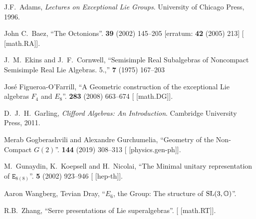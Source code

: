 \begin{thebibliography}{99}
\footnotesize%

J.F.\ Adams,
\textit{Lectures on Exceptional Lie Groups}.
University of Chicago Press, 1996.

John C.~Baez,
``The Octonions''.
 \textbf{39} (2002) 145--205
[erratum:  \textbf{42} (2005) 213]
{\tt{}}
[ [math.RA]].

J.~M.~Ekins and J.~F.~Cornwell,
``Semisimple Real Subalgebras of Noncompact Semisimple Real Lie Algebras. 5.,''
 \textbf{7} (1975) 167--203
{\tt{}}


Jos\'e Figueroa-O'Farrill,
``A Geometric construction of the exceptional Lie algebras $F_{4}$ and $E_{8}$''.
 \textbf{283} (2008) 663--674
{\tt{}}
[ [math.DG]].

D.~J.~H.~Garling,
\textit{Clifford Algebras: An Introduction}.
Cambridge University Press, 2011.

Merab Gogberashvili and Alexandre Gurchumelia,
``Geometry of the Non-Compact $G(2)$''.
 \textbf{144} (2019) 308--313
{\tt{}}
[ [physics.gen-ph]].

M.~Gunaydin, K.~Koepsell and H.~Nicolai,
``The Minimal unitary representation of $\mathtt{E}_{8(8)}$''.
 \textbf{5} (2002) 923--946
{\tt{}}
[ [hep-th]].

Aaron Wangberg, Tevian Dray,
``$E_{6}$, the Group: The structure of $\operatorname{SL}(3,\mathbb{O})$''.

R.B.~Zhang,
``Serre presentations of Lie superalgebras''.
[ [math.RT]].

\end{thebibliography}


